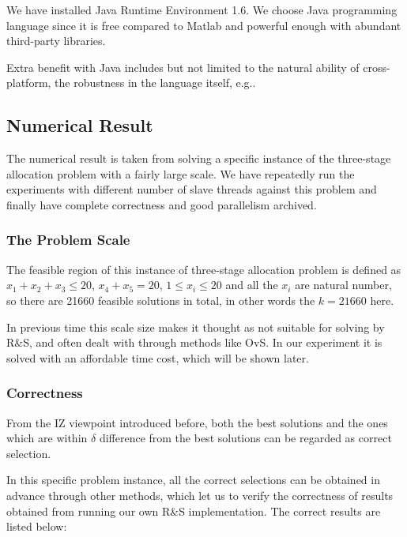 We have installed Java Runtime Environment 1.6. We choose Java programming language since it is free compared to Matlab and powerful enough with abundant third-party libraries.

Extra benefit with Java includes but not limited to the natural ability of cross-platform, the robustness in the language itself, e.g..

\subsection{Numerical Result}

The numerical result is taken from solving a specific instance of the three-stage allocation problem with a fairly large scale. We have repeatedly run the experiments with different number of slave threads against this problem and finally have complete correctness and good parallelism archived.

\subsubsection{The Problem Scale}

The feasible region of this instance of three-stage allocation problem is defined as $x_1 + x_2 + x_3 \leqslant 20$, $x_4 + x_5 = 20$, $1 \leqslant x_i \leqslant 20$ and all the $x_i$ are natural number, so there are 21660 feasible solutions in total, in other words the $k = 21660$ here.

In previous time this scale size makes it thought as not suitable for solving by R\&S, and often dealt with through methods like OvS. In our experiment it is solved with an affordable time cost, which will be shown later.

\subsubsection{Correctness}

From the IZ viewpoint introduced before, both the best solutions and the ones which are within $\delta$ difference from the best solutions can be regarded as correct selection.

In this specific problem instance, all the correct selections can be obtained in advance through other methods, which let us to verify the correctness of results obtained from running our own R\&S implementation. The correct results are listed below:

